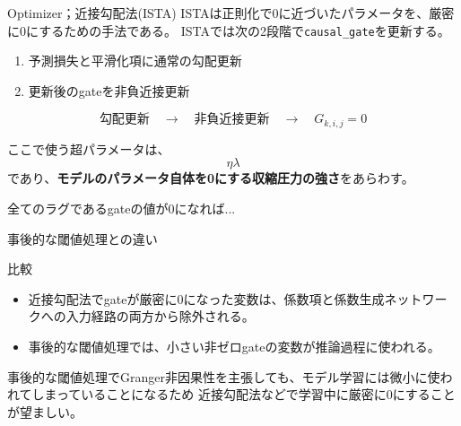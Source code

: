 \documentclass[dvipdfmx,11pt]{beamer}
\begin{document}
\begin{frame}{Optimizer；近接勾配法(ISTA)}
ISTAは正則化で0に近づいたパラメータを、厳密に0にするための手法である。
ISTAでは次の2段階で\texttt{causal\_gate}を更新する。
\begin{center}
  \begin{enumerate}
    \item 予測損失と平滑化項に通常の勾配更新
    \item 更新後のgateを非負近接更新
  \end{enumerate}
\end{center}

  \[
    \text{勾配更新}
    \quad \longrightarrow \quad
    \text{非負近接更新}
    \quad \longrightarrow \quad
    G_{k,i,j}=0
  \]

  \vspace{0.6em}
  ここで使う超パラメータは、
  \[
    \eta \lambda
  \]
  であり、\textbf{モデルのパラメータ自体を0にする収縮圧力の強さ}をあらわす。

  \vspace{0.4em}
  全てのラグであるgateの値が0になれば...

\end{frame}

\begin{frame}{事後的な閾値処理との違い}

  \vspace{0.55em}
  \begin{block}{比較}
    \begin{itemize}
      \item 近接勾配法でgateが厳密に0になった変数は、係数項と係数生成ネットワークへの入力経路の両方から除外される。
      \item 事後的な閾値処理では、小さい非ゼロgateの変数が推論過程に使われる。
    \end{itemize}
  \end{block}
  \vspace{1.5em}
   事後的な閾値処理でGranger非因果性を主張しても、モデル学習には微小に使われてしまっていることになるため
   近接勾配法などで学習中に厳密に0にすることが望ましい。

\end{frame}
\end{document}
